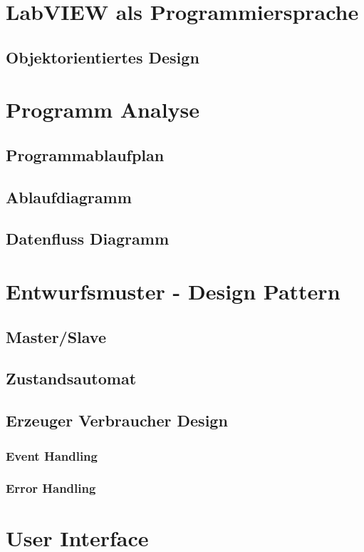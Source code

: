 \section{LabVIEW als Programmiersprache}
	\label{sec:labview}
	\subsection{Objektorientiertes Design}  %

\section{Programm Analyse}
		\subsection{Programmablaufplan} %
		\subsection{Ablaufdiagramm }
		\subsection{Datenfluss Diagramm}

\section{Entwurfsmuster - Design Pattern}
		\subsection{Master/Slave}
		\subsection{Zustandsautomat}%
		\subsection{Erzeuger Verbraucher Design} %
		\subsubsection{Event Handling}
		\subsubsection{Error Handling} %
		
\section{User Interface}

